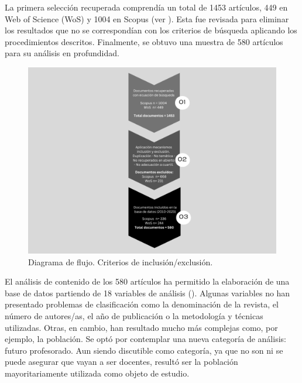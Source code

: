 \documentclass[spanish]{textolivre}
\begin{document}
La primera selección recuperada comprendía un total de 1453 artículos, 449 en Web of Science (WoS) y 1004 en Scopus (ver ). Esta fue revisada para eliminar los resultados que no se correspondían con los criterios de búsqueda aplicando los procedimientos descritos. Finalmente, se obtuvo una muestra de 580 artículos para su análisis en profundidad. 

\begin{figure}[h!]
    \begin{minipage}{.9\textwidth}
    \centering
    \includegraphics[width=\linewidth]{images/image1.png}
    \caption{Diagrama de flujo. Criterios de inclusión/exclusión.}
    \label{fig-1}
    \end{minipage}
\end{figure}

El análisis de contenido de los 580 artículos ha permitido la elaboración de una base de datos partiendo de 18 variables de análisis (). Algunas variables no han presentado problemas de clasificación como la denominación de la revista, el número de autores/as, el año de publicación o la metodología y técnicas utilizadas. Otras, en cambio, han resultado mucho más complejas como, por ejemplo, la población. Se optó por contemplar una nueva categoría de análisis: futuro profesorado. Aun siendo discutible como categoría, ya que no son ni se puede asegurar que vayan a ser docentes, resultó ser la población mayoritariamente utilizada como objeto de estudio. 
\end{document}

